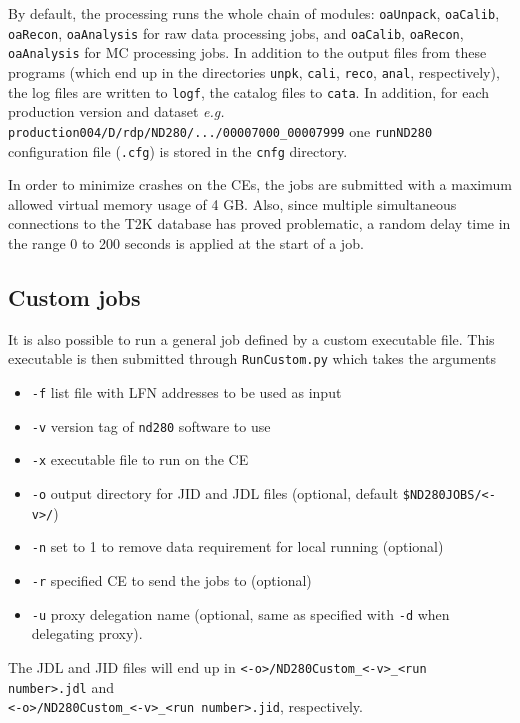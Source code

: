 \documentclass[11pt]{article}
\begin{document}
By default, the processing runs the whole chain of modules:
\verb+oaUnpack+, \verb+oaCalib+, \verb+oaRecon+, \verb+oaAnalysis+ for
raw data processing jobs, and \verb+oaCalib+, \verb+oaRecon+,
\verb+oaAnalysis+ for MC processing jobs. In addition to the output
files from these programs (which end up in the directories
\verb+unpk+, \verb+cali+, \verb+reco+, \verb+anal+, respectively), the
log files are written to \verb+logf+, the catalog files to
\verb+cata+. In addition, for each production version and dataset
\textit{e.g.} \\
\verb+production004/D/rdp/ND280/.../00007000_00007999+ one
\verb+runND280+ configuration file (\verb+.cfg+) is stored in the
\verb+cnfg+ directory.

In order to minimize crashes on the CEs, the jobs are submitted with a
maximum allowed virtual memory usage of 4 GB. Also, since multiple
simultaneous connections to the T2K database has proved problematic, a
random delay time in the range 0 to 200 seconds is applied at the
start of a job.

\subsection{Custom jobs}

It is also possible to run a general job defined by a custom
executable file. This executable is then submitted through
\verb+RunCustom.py+ which takes the arguments
\begin{itemize}
\item \verb+-f+ list file with LFN addresses to be used as input
\item \verb+-v+ version tag of \verb+nd280+ software to use
\item \verb+-x+ executable file to run on the CE
\item \verb+-o+ output directory for JID and JDL files (optional, default \verb+$ND280JOBS/<-v>/+)
\item \verb+-n+ set to 1 to remove data requirement for local running (optional)
\item \verb+-r+ specified CE to send the jobs to (optional)
\item \verb+-u+ proxy delegation name (optional, same as specified with \verb+-d+ when delegating proxy).
\end{itemize}

The JDL and JID files will end up in \verb+<-o>/ND280Custom_<-v>_<run number>.jdl+ and\\ \verb+<-o>/ND280Custom_<-v>_<run number>.jid+, respectively.
\end{document}
